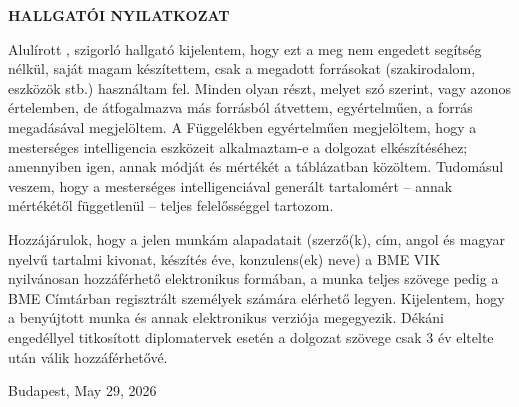 \begin{center}
\large
\textbf{HALLGATÓI NYILATKOZAT}\\
\end{center}

Alulírott \emph{\vikszerzoVezeteknev{} \vikszerzoKeresztnev}, szigorló hallgató kijelentem, hogy ezt a \vikmunkatipusat{} meg nem engedett segítség nélkül, saját magam készítettem, csak a megadott forrásokat (szakirodalom, eszközök stb.) használtam fel. Minden olyan részt, melyet szó szerint, vagy azonos értelemben, de átfogalmazva más forrásból átvettem, egyértelműen, a forrás megadásával megjelöltem. A Függelékben egyértelműen megjelöltem, hogy a mesterséges intelligencia eszközeit alkalmaztam-e a dolgozat elkészítéséhez; amennyiben igen, annak módját és mértékét a táblázatban közöltem. Tudomásul veszem, hogy a mesterséges intelligenciával generált tartalomért -- annak mértékétől függetlenül -- teljes felelősséggel tartozom.

Hozzájárulok, hogy a jelen munkám alapadatait (szerző(k), cím, angol és magyar nyelvű tartalmi kivonat, készítés éve, konzulens(ek) neve) a BME VIK nyilvánosan hozzáférhető elektronikus formában, a munka teljes szövege pedig a BME Címtárban regisztrált személyek számára elérhető legyen. Kijelentem, hogy a benyújtott munka és annak elektronikus verziója megegyezik. Dékáni engedéllyel titkosított diplomatervek esetén a dolgozat szövege csak 3 év eltelte után válik hozzáférhetővé.

\begin{flushleft}
\vspace*{1cm}
Budapest, May 29, 2026
\end{flushleft}

\begin{flushright}
 \vspace*{1cm}
 \makebox[7cm]{\rule{6cm}{.4pt}}\\
 \makebox[7cm]{\emph{\vikszerzoVezeteknev{} \vikszerzoKeresztnev}}\\
\end{flushright}
\thispagestyle{empty}

\vfill
\clearpage
\thispagestyle{empty} %

\selectthesislanguage
